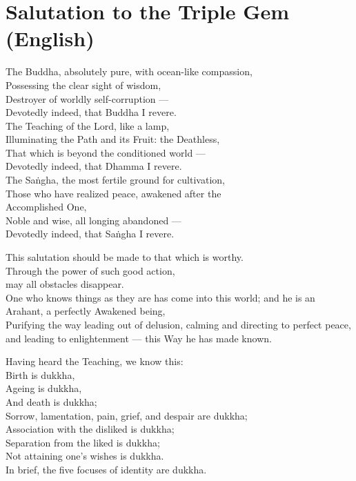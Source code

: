 \section*{Salutation to the Triple Gem (English)}

\begin{leader}
\end{leader}

The Buddha, absolutely pure, with ocean-like compassion,\\
Possessing the clear sight of wisdom,\\
Destroyer of worldly self-corruption ---\\
Devotedly indeed, that Buddha I revere.\\
The Teaching of the Lord, like a lamp,\\
Illuminating the Path and its Fruit: the Deathless,\\
That which is beyond the conditioned world ---\\
Devotedly indeed, that Dhamma I revere.\\
The Saṅgha, the most fertile ground for cultivation,\\
Those who have realized peace, awakened after the \\Accomplished One,\\
Noble and wise, all longing abandoned ---\\
Devotedly indeed, that Saṅgha I revere.

This salutation should be made to that which is worthy.\\
Through the power of such good action,\\\vin may all obstacles disappear.\\
One who knows things as they are has come into this world; and he is an Arahant, a perfectly Awakened being,\\
Purifying the way leading out of delusion, calming and directing to perfect peace, and leading to enlightenment --- this Way he has made known.

Having heard the Teaching, we know this:\\
Birth is dukkha,\\
Ageing is dukkha,\\
And death is dukkha;\\
Sorrow, lamentation, pain, grief, and despair are dukkha;\\
Association with the disliked is dukkha;\\
Separation from the liked is dukkha;\\
Not attaining one's wishes is dukkha.\\
In brief, the five focuses of identity are dukkha.

